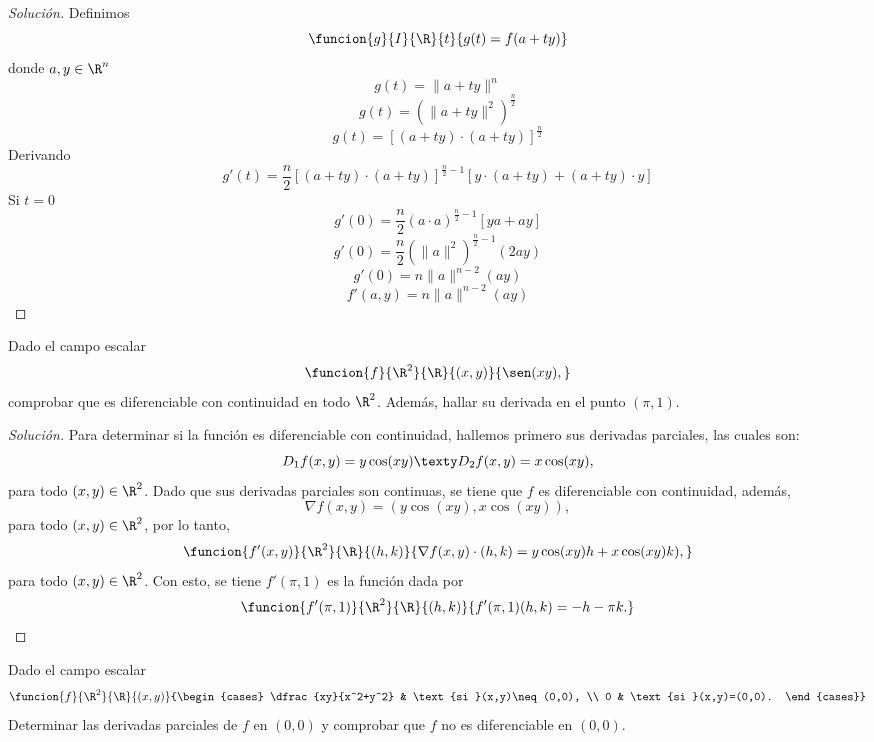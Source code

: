 \documentclass[a4,11pt]{aleph-notas}
\begin{document}
\begin{proof}[Solución]
Definimos
    \[
        \funcion{g}{I}{\R}{t}{g{(t)=f(a+ty)}}
    \]
    donde $a,y\in \R^n$        
    \[
        g(t)=\| a+ty \|^n
    \]  
    \[
        g(t)=(\| a+ty \|^2)^{\frac{n}{2}}
    \]
    \[
        g(t)=[(a+ty)\cdot (a+ty)]^{\frac{n}{2}}
    \]
    Derivando     
    \[
        g'(t)=\frac{n}{2}[(a+ty)\cdot (a+ty)]^{\frac{n}{2}-1}[y\cdot(a+ty)+(a+ty)\cdot y]
    \]
    Si $t=0$
    \[
        g'(0)=\frac{n}{2}(a\cdot a)^{\frac{n}{2}-1}[ya+ay]
    \]
    \[
        g'(0)=\frac{n}{2}(\| a \|^2)^{\frac{n}{2}-1}(2ay)
    \]
    \[
        g'(0)=n\|a\|^{n-2}(ay)
    \] 
    \[
        f'(a,y)=n\|a\|^{n-2}(ay)
    \]
\end{proof}

\begin{ejer}
Dado el campo escalar
    \[
        \funcion{f}{\R^2}{\R}{(x,y)}{\sen(xy),}
    \]
    comprobar que es diferenciable con continuidad en todo $\R^2$. Además, hallar su derivada en el punto $(\pi,1)$.
\end{ejer}

\begin{proof}[Solución]
Para determinar si la función es diferenciable con continuidad, hallemos primero sus derivadas parciales, las cuales son:
    \[
        D_1f(x,y)=y\cos(xy)
        \texty
        D_2f(x,y)=x\cos(xy),
    \]
    para todo $(x,y)\in\R^2$. Dado que sus derivadas parciales son continuas, se tiene que $f$ es diferenciable con continuidad, además, 
    \[
        \nabla f(x,y)=(y\cos(xy),x\cos(xy)),
    \]
    para todo $(x,y)\in\R^2$, por lo tanto,
    \[
        \funcion{f'(x,y)}{\R^2}{\R}{(h,k)}{\nabla f(x,y)\cdot(h,k)=y\cos(xy)h+x\cos(xy)k),}
    \]
    para todo $(x,y)\in\R^2$. Con esto, se tiene $f'(\pi,1)$ es la función dada por
    \[
        \funcion{f'(\pi,1)}{\R^2}{\R}{(h,k)}{f'(\pi,1)(h,k)=-h-\pi k.}\qedhere
    \]
\end{proof}

\begin{ejer}
Dado el campo escalar 
    \[
        \funcion{f}{\R^2}{\R}{(x,y)}
            {\begin{cases}
                \dfrac{xy}{x^2+y^2} & \text{si }(x,y)\neq(0,0), \\
                0 & \text{si }(x,y)=(0,0).
            \end{cases}}
    \]
    Determinar las derivadas parciales de $f$ en $(0,0)$ y comprobar que $f$ no es diferenciable en $(0,0)$.
\end{ejer}
\end{document}
